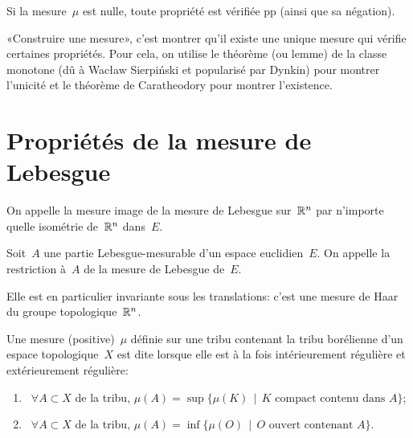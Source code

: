 Si la mesure~$\mu$ est nulle, toute propriété est vérifiée pp (ainsi que sa négation).

\medskip
{}
«Construire une mesure», c'est montrer qu'il existe une unique mesure qui vérifie certaines propriétés. 
Pour cela, on utilise le théorème (ou lemme) de la classe monotone (dû à Wacław Sierpiński et popularisé par Dynkin) pour montrer l'unicité et le théorème de Caratheodory pour montrer l'existence.

\section{Propriétés de la mesure de Lebesgue}

On appelle  la mesure image de la mesure de Lebesgue sur~$\mathbb R^n$ par n'importe quelle isométrie de~$\mathbb R^n$ dans~$E$.

Soit~$A$ une partie Lebesgue-mesurable d'un espace euclidien~$E$.
On appelle  la restriction à~$A$ de la mesure de Lebesgue de~$E$.

\begin{theoreme}
Elle est en particulier invariante sous les translations: c'est une mesure de Haar 
du groupe topologique~$\mathbb R^n$.
\end{theoreme}


\begin{definition}
Une mesure (positive)~$\mu$ définie sur une tribu contenant la tribu borélienne d'un espace topologique~$X$ est dite  lorsque elle est à la fois intérieurement régulière et extérieurement régulière:
\begin{enumerate}
\item~$\forall A\subset X$ de la tribu, $\mu(A)=\sup\{\mu(K)\,\mid\, K \text{ compact contenu dans } A\}$;
\item~$\forall A\subset X$ de la tribu, $\mu(A)=\inf\{\mu(O)\,\mid\, O \text{ ouvert contenant } A\}$.
\end{enumerate}
\end{definition}

